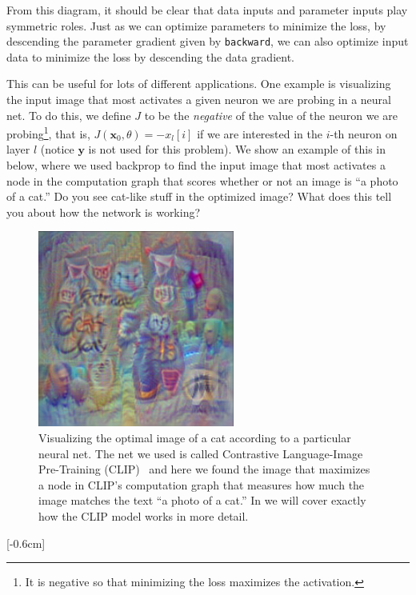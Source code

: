 From this diagram, it should be clear that data inputs and parameter inputs play symmetric roles. Just as we can optimize parameters to minimize the loss, by descending the parameter gradient given by \texttt{backward}, we can also optimize input data to minimize the loss by descending the data gradient.

This can be useful for lots of different applications. One example is visualizing the input image that most activates a given neuron we are probing in a neural net. To do this, we define $J$ to be the \textit{negative} of the value of the neuron we are probing\footnote{It is negative so that minimizing the loss maximizes the activation.}, that is, $J(\mathbf{x}_0,\theta) = -x_{l}[i]$ if we are interested in the $i$-th neuron on layer $l$ (notice $\mathbf{y}$ is not used for this problem). We show an example of this in \fig{\ref{fig:backpropagation:backprop_to_the_data_example}} below, where we used backprop to find the input image that most activates a node in the computation graph that scores whether or not an image is ``a photo of a cat.'' Do you see cat-like stuff in the optimized image? What does this tell you about how the network is working?
\begin{figure}[h!]
    \centerline{
        \includegraphics[width=.45\linewidth]{./figures/backpropagation/backprop_to_the_data_example.png}
    }
    \caption{Visualizing the optimal image of a cat according to a particular neural net. The net we used is called Contrastive Language-Image Pre-Training (CLIP)~\cite{radford2021learning} and here we found the image that maximizes a node in CLIP's computation graph that measures how much the image matches the text ``a photo of a cat.'' In \chap{\ref{chapter:VLMs}} we will cover exactly how the CLIP model works in more detail.}
    \label{fig:backpropagation:backprop_to_the_data_example}
\end{figure}

[-0.6cm]

